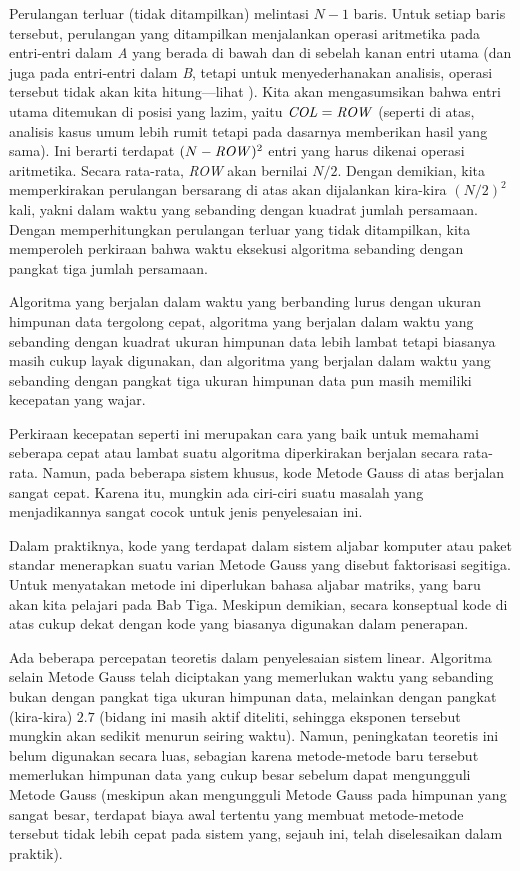Perulangan terluar (tidak ditampilkan) melintasi $N-1$ baris.
Untuk setiap baris tersebut,
perulangan yang ditampilkan menjalankan operasi aritmetika pada entri-entri
dalam \textit{A} yang berada di bawah dan di sebelah kanan entri utama
(dan juga pada entri-entri dalam \textit{B}, tetapi untuk menyederhanakan
analisis, operasi tersebut tidak akan kita hitung---lihat \nearbyexercise{}).
Kita akan mengasumsikan bahwa entri utama ditemukan di posisi yang lazim,
yaitu
$\text{\textit{COL}}=\text{\textit{ROW}}$
(seperti di atas, analisis kasus umum lebih rumit tetapi pada dasarnya
memberikan hasil yang sama).
Ini berarti terdapat $(N-\text{\textit{ROW}})^2$ entri yang harus dikenai
operasi aritmetika.
Secara rata-rata, \textit{ROW} akan bernilai $N/2$.
Dengan demikian, kita memperkirakan perulangan bersarang di atas akan
dijalankan kira-kira $(N/2)^2$ kali,
yakni dalam waktu yang sebanding dengan kuadrat jumlah persamaan.
Dengan memperhitungkan perulangan terluar yang tidak ditampilkan, kita
memperoleh perkiraan bahwa waktu eksekusi algoritma sebanding dengan pangkat
tiga jumlah persamaan.

Algoritma yang berjalan dalam waktu yang berbanding lurus dengan ukuran
himpunan data tergolong cepat, algoritma yang berjalan dalam waktu yang
sebanding dengan kuadrat ukuran himpunan data lebih lambat tetapi biasanya
masih cukup layak digunakan, dan algoritma yang berjalan dalam waktu yang
sebanding dengan pangkat tiga ukuran himpunan data pun masih memiliki
kecepatan yang wajar.

Perkiraan kecepatan seperti ini merupakan cara yang baik untuk memahami
seberapa cepat atau lambat suatu algoritma diperkirakan berjalan secara
rata-rata.
Namun, pada beberapa sistem khusus, kode Metode Gauss di atas berjalan sangat
cepat. Karena itu, mungkin ada ciri-ciri suatu masalah yang menjadikannya
sangat cocok untuk jenis penyelesaian ini.

Dalam praktiknya, kode yang terdapat dalam sistem aljabar komputer atau paket
standar menerapkan suatu varian Metode Gauss yang disebut faktorisasi
segitiga.
Untuk menyatakan metode ini diperlukan bahasa aljabar matriks, yang baru akan
kita pelajari pada Bab Tiga.
Meskipun demikian, secara konseptual kode di atas cukup dekat dengan kode yang
biasanya digunakan dalam penerapan.

Ada beberapa percepatan teoretis dalam penyelesaian sistem linear.
Algoritma selain Metode Gauss telah diciptakan yang memerlukan waktu yang
sebanding bukan dengan pangkat tiga ukuran himpunan data, melainkan dengan
pangkat (kira-kira) $2.7$
(bidang ini masih aktif diteliti, sehingga eksponen tersebut mungkin akan
sedikit menurun seiring waktu).
Namun, peningkatan teoretis ini belum digunakan secara luas,
sebagian karena metode-metode baru tersebut memerlukan himpunan data yang
cukup besar sebelum dapat mengungguli Metode Gauss
(meskipun akan mengungguli Metode Gauss pada himpunan yang sangat besar,
terdapat biaya awal tertentu yang membuat metode-metode tersebut tidak lebih
cepat pada sistem yang, sejauh ini, telah diselesaikan dalam praktik).



